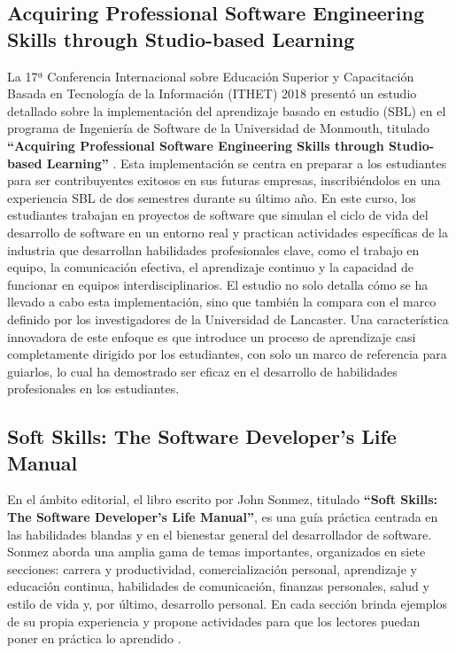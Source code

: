 \subsection{Acquiring Professional Software Engineering Skills through Studio-based Learning}

La 17ª Conferencia Internacional sobre Educación Superior y Capacitación Basada en Tecnología de la Información (ITHET) 2018 presentó un estudio detallado sobre la implementación del aprendizaje basado en estudio (SBL) en el programa de Ingeniería de Software de la Universidad de Monmouth, titulado \textbf{“Acquiring Professional Software Engineering Skills through Studio-based Learning”} \cite{Rosca2018}. Esta implementación se centra en preparar a los estudiantes para ser contribuyentes exitosos en sus futuras empresas, inscribiéndolos en una experiencia SBL de dos semestres durante su último año. En este curso, los estudiantes trabajan en proyectos de software que simulan el ciclo de vida del desarrollo de software en un entorno real y practican actividades específicas de la industria que desarrollan habilidades profesionales clave, como el trabajo en equipo, la comunicación efectiva, el aprendizaje continuo y la capacidad de funcionar en equipos interdisciplinarios. El estudio no solo detalla cómo se ha llevado a cabo esta implementación, sino que también la compara con el marco definido por los investigadores de la Universidad de Lancaster. Una característica innovadora de este enfoque es que introduce un proceso de aprendizaje casi completamente dirigido por los estudiantes, con solo un marco de referencia para guiarlos, lo cual ha demostrado ser eficaz en el desarrollo de habilidades profesionales en los estudiantes.

\subsection{Soft Skills: The Software Developer's Life Manual}

En el ámbito editorial, el libro escrito por John Sonmez, titulado \textbf{“Soft Skills: The Software Developer’s Life Manual”}, es una guía práctica centrada en las habilidades blandas y en el bienestar general del desarrollador de software. Sonmez aborda una amplia gama de temas importantes, organizados en siete secciones: carrera y productividad, comercialización personal, aprendizaje y educación continua, habilidades de comunicación, finanzas personales, salud y estilo de vida y, por último, desarrollo personal. En cada sección brinda ejemplos de su propia experiencia y propone actividades para que los lectores puedan poner en práctica lo aprendido \cite{Sonmez2014}.

